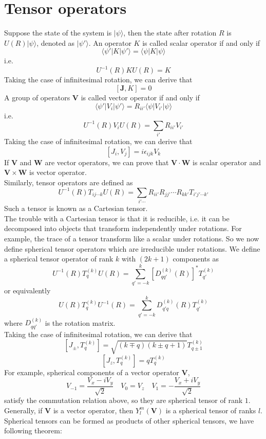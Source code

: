 \section{Tensor operators}
Suppose the state of the system is $|\psi\rangle$, then the state after rotation $R$ is $U(R)|\psi\rangle$, denoted as $|\psi'\rangle$. An operator $K$ is called scalar operator if and only if
\[\langle \psi' | K | \psi' \rangle = \langle \psi | K | \psi\rangle\]
i.e.
\[U^{-1}(R)KU(R) = K\]
Taking the case of infinitesimal rotation, we can derive that
\[[\bm{J},K] = 0\]
A group of operators $\bm{V}$ is called vector operator if and only if
\[\langle \psi' | V_i | \psi' \rangle = R_{ii'} \langle \psi | V_{i'} | \psi\rangle\]
i.e.
\[U^{-1}(R)V_{i}U(R) = \sum_{i'} R_{ii'} V_{i'}\]
Taking the case of infinitesimal rotation, we can derive that
\[[J_i, V_j] = i\epsilon_{ijk}V_k\]
If $\bm{V}$ and $\bm{W}$ are vector operators, we can prove that $\bm{V} \cdot \bm{W}$ is scalar operator and $\bm{V} \times \bm{W}$ is vector operator.\\
Similarly, tensor operators are defined as
\[U^{-1}(R) T_{ij\cdots k} U(R) = \sum_{i'\cdots} R_{ii'} R_{jj'} \cdots R_{kk'} T_{i'j'\cdots k'}\]
Such a tensor is known as a Cartesian tensor.\\
The trouble with a Cartesian tensor is that it is reducible, i.e. it can be decomposed into objects that transform independently under rotations. For example, the trace of a tensor transform like a scalar under rotations. 
So we now define spherical tensor operators which are irreducible under rotations.  We define a spherical tensor operator of rank $k$ with $(2k+1)$ components as
\[U^{-1}(R) T^{(k)}_q U(R) = \sum_{q'=-k}^{k} [D^{(k)}_{qq'}(R)]^* T^{(k)}_{q'}\]
or equivalently
\[U(R) T^{(k)}_q U^{-1}(R) = \sum_{q'=-k}^{k} D^{(k)}_{q'q}(R) T^{(k)}_{q'}\]
where $D^{(k)}_{qq'}$ is the rotation matrix.\\
Taking the case of infinitesimal rotation, we can derive that
\[[J_{\pm},T^{(k)}_{q}] = \sqrt{(k \mp q)(k \pm q +1)} T^{(k)}_{q \pm 1}\]
\[[J_z, T^{(k)}_{q}] = q T^{(k)}_{q}\]
For example, spherical components of a vector operator $\bm{V}$, 
\[V_{-1} = \frac{V_x - i V_y}{\sqrt{2}} \quad V_0 = V_z \quad V_{1} = -\frac{V_x + i V_y}{\sqrt{2}}\]
satisfy the commutation relation above, so they are spherical tensor of rank $1$. Generally, if $\bm{V}$ is a vector operator, then $Y_l^m(\bm{V})$ is a spherical tensor of ranks $l$.
\\
Spherical tensors can be formed as products of other spherical  tensors, we have following theorem:
\\

